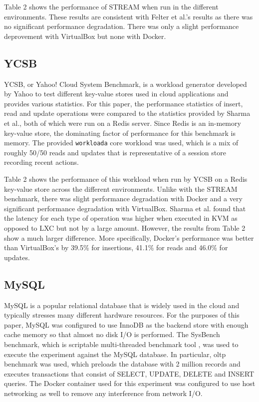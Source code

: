 \documentclass{sig-alternate-10pt}
\begin{document}
Table 2 shows the performance of STREAM when run in the different environments. These results are consistent with Felter et al.'s results as there was no significant performance degradation. There was only a slight performance deprovement with VirtualBox but none with Docker. 

\subsection{YCSB}
YCSB, or Yahoo! Cloud System Benchmark, is a workload generator developed by Yahoo to test different key-value stores used in cloud applications and provides various statistics. For this paper, the performance statistics of insert, read and update operations were compared to the statistics provided by Sharma et al., both of which were run on a Redis server. Since Redis is an in-memory key-value store, the dominating factor of performance for this benchmark is memory. The provided \texttt{workloada} core workload was used, which is a mix of roughly 50/50 reads and updates that is representative of a session store recording recent actions\cite{ycsb:wiki}. 

Table 2 shows the performance of this workload when run by YCSB on a Redis key-value store across the different environments. Unlike with the STREAM benchmark, there was slight performance degradation with Docker and a very significant performance degradation with VirtualBox. Sharma et al. found that the latency for each type of operation was higher when executed in KVM as opposed to LXC\cite{sharma:2016} but not by a large amount. However, the results from Table 2 show a much larger difference. More specifically, Docker's performance was better than VirtualBox's by 39.5\% for insertions, 41.1\% for reads and 46.0\% for updates. 

\subsection{MySQL}
MySQL is a popular relational database that is widely used in the cloud and typically stresses many different hardware resources. For the purposes of this paper, MySQL was configured to use InnoDB as the backend store with enough cache memory so that almost no disk I/O is performed. The SysBench benchmark, which is scriptable multi-threaded benchmark tool \cite{sysbench:wiki}, was used to execute the experiment against the MySQL database. In particular, oltp benchmark was used, which preloads the database with 2 million records and executes transactions that consist of SELECT, UPDATE, DELETE and INSERT queries. The Docker container used for this experiment was configured to use host networking as well to remove any interference from network I/O. 
\end{document}
